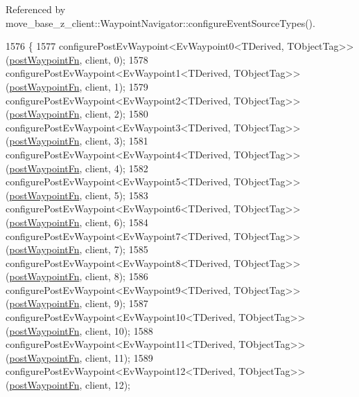 Referenced by move\+\_\+base\+\_\+z\+\_\+client\+::\+Waypoint\+Navigator\+::configure\+Event\+Source\+Types().


\begin{DoxyCode}
1576 \{
1577     configurePostEvWaypoint<EvWaypoint0<TDerived, TObjectTag>>(\hyperlink{classmove__base__z__client_1_1WaypointEventDispatcher_acc538eb7506c13f7cca2268a1742dadd}{postWaypointFn}, client, 0);
1578     configurePostEvWaypoint<EvWaypoint1<TDerived, TObjectTag>>(\hyperlink{classmove__base__z__client_1_1WaypointEventDispatcher_acc538eb7506c13f7cca2268a1742dadd}{postWaypointFn}, client, 1);
1579     configurePostEvWaypoint<EvWaypoint2<TDerived, TObjectTag>>(\hyperlink{classmove__base__z__client_1_1WaypointEventDispatcher_acc538eb7506c13f7cca2268a1742dadd}{postWaypointFn}, client, 2);
1580     configurePostEvWaypoint<EvWaypoint3<TDerived, TObjectTag>>(\hyperlink{classmove__base__z__client_1_1WaypointEventDispatcher_acc538eb7506c13f7cca2268a1742dadd}{postWaypointFn}, client, 3);
1581     configurePostEvWaypoint<EvWaypoint4<TDerived, TObjectTag>>(\hyperlink{classmove__base__z__client_1_1WaypointEventDispatcher_acc538eb7506c13f7cca2268a1742dadd}{postWaypointFn}, client, 4);
1582     configurePostEvWaypoint<EvWaypoint5<TDerived, TObjectTag>>(\hyperlink{classmove__base__z__client_1_1WaypointEventDispatcher_acc538eb7506c13f7cca2268a1742dadd}{postWaypointFn}, client, 5);
1583     configurePostEvWaypoint<EvWaypoint6<TDerived, TObjectTag>>(\hyperlink{classmove__base__z__client_1_1WaypointEventDispatcher_acc538eb7506c13f7cca2268a1742dadd}{postWaypointFn}, client, 6);
1584     configurePostEvWaypoint<EvWaypoint7<TDerived, TObjectTag>>(\hyperlink{classmove__base__z__client_1_1WaypointEventDispatcher_acc538eb7506c13f7cca2268a1742dadd}{postWaypointFn}, client, 7);
1585     configurePostEvWaypoint<EvWaypoint8<TDerived, TObjectTag>>(\hyperlink{classmove__base__z__client_1_1WaypointEventDispatcher_acc538eb7506c13f7cca2268a1742dadd}{postWaypointFn}, client, 8);
1586     configurePostEvWaypoint<EvWaypoint9<TDerived, TObjectTag>>(\hyperlink{classmove__base__z__client_1_1WaypointEventDispatcher_acc538eb7506c13f7cca2268a1742dadd}{postWaypointFn}, client, 9);
1587     configurePostEvWaypoint<EvWaypoint10<TDerived, TObjectTag>>(\hyperlink{classmove__base__z__client_1_1WaypointEventDispatcher_acc538eb7506c13f7cca2268a1742dadd}{postWaypointFn}, client, 10);
1588     configurePostEvWaypoint<EvWaypoint11<TDerived, TObjectTag>>(\hyperlink{classmove__base__z__client_1_1WaypointEventDispatcher_acc538eb7506c13f7cca2268a1742dadd}{postWaypointFn}, client, 11);
1589     configurePostEvWaypoint<EvWaypoint12<TDerived, TObjectTag>>(\hyperlink{classmove__base__z__client_1_1WaypointEventDispatcher_acc538eb7506c13f7cca2268a1742dadd}{postWaypointFn}, client, 12);

\end{DoxyCode}
